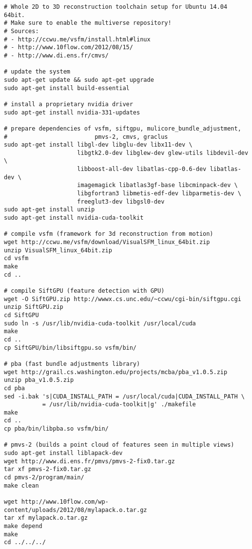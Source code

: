 \begin{verbatim} 
# Whole 2D to 3D reconstruction toolchain setup for Ubuntu 14.04 64bit.
# Make sure to enable the multiverse repository!
# Sources: 
# - http://ccwu.me/vsfm/install.html#linux
# - http://www.10flow.com/2012/08/15/
# - http://www.di.ens.fr/cmvs/

# update the system
sudo apt-get update && sudo apt-get upgrade
sudo apt-get install build-essential

# install a proprietary nvidia driver
sudo apt-get install nvidia-331-updates

# prepare dependencies of vsfm, siftgpu, mulicore_bundle_adjustment, 
#                         pmvs-2, cmvs, graclus
sudo apt-get install libgl-dev libglu-dev libx11-dev \
                     libgtk2.0-dev libglew-dev glew-utils libdevil-dev \
                     libboost-all-dev libatlas-cpp-0.6-dev libatlas-dev \
                     imagemagick libatlas3gf-base libcminpack-dev \
                     libgfortran3 libmetis-edf-dev libparmetis-dev \
                     freeglut3-dev libgsl0-dev
sudo apt-get install unzip
sudo apt-get install nvidia-cuda-toolkit

# compile vsfm (framework for 3d reconstruction from motion)
wget http://ccwu.me/vsfm/download/VisualSFM_linux_64bit.zip
unzip VisualSFM_linux_64bit.zip
cd vsfm
make 
cd ..

# compile SiftGPU (feature detection with GPU)
wget -O SiftGPU.zip http://wwwx.cs.unc.edu/~ccwu/cgi-bin/siftgpu.cgi
unzip SiftGPU.zip
cd SiftGPU
sudo ln -s /usr/lib/nvidia-cuda-toolkit /usr/local/cuda
make
cd ..
cp SiftGPU/bin/libsiftgpu.so vsfm/bin/

# pba (fast bundle adjustments library)
wget http://grail.cs.washington.edu/projects/mcba/pba_v1.0.5.zip 
unzip pba_v1.0.5.zip
cd pba
sed -i.bak 's|CUDA_INSTALL_PATH = /usr/local/cuda|CUDA_INSTALL_PATH \
           = /usr/lib/nvidia-cuda-toolkit|g' ./makefile
make
cd ..
cp pba/bin/libpba.so vsfm/bin/

# pmvs-2 (builds a point cloud of features seen in multiple views)
sudo apt-get install liblapack-dev
wget http://www.di.ens.fr/pmvs/pmvs-2-fix0.tar.gz
tar xf pmvs-2-fix0.tar.gz
cd pmvs-2/program/main/
make clean

wget http://www.10flow.com/wp-content/uploads/2012/08/mylapack.o.tar.gz
tar xf mylapack.o.tar.gz
make depend
make
cd ../../../
\end{verbatim}

